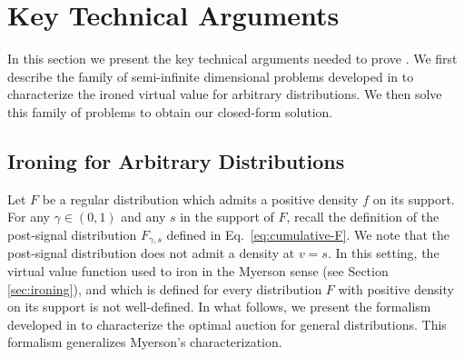 \section{Key Technical Arguments}
\label{sec:technical_work}
In this section we present the key technical arguments needed to prove . We first describe the family of semi-infinite dimensional problems developed in \citet{monteiro2010optimal} to characterize the ironed virtual value for arbitrary distributions. We then solve this family of problems to obtain our closed-form solution.

\subsection{Ironing for Arbitrary Distributions}
\label{sec:gen_ironing}
Let $F$ be a regular distribution which admits a positive density $f$ on its support. 
For any $\gamma \in (0,1)$ and any $s$ in the support of $F$, recall the definition of the post-signal distribution $F_{\gamma,s}$ defined in Eq.~\eqref{eq:cumulative-F}.
We note that the post-signal distribution does not admit a density at $v = s$. In this setting, the virtual value function used to iron in the Myerson sense (see Section \ref{sec:ironing}), and which is defined for every distribution $F$ with positive density on its support
is not well-defined. In what follows, we present the formalism developed in \citet{monteiro2010optimal} to characterize the optimal auction for general distributions. This formalism generalizes Myerson's characterization.

